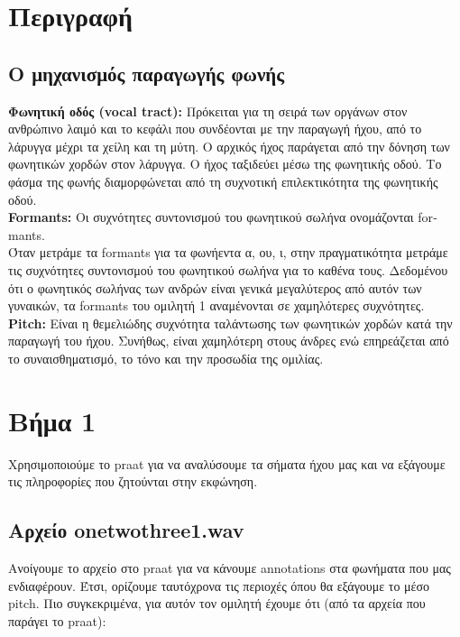 \section*{Περιγραφή}

\subsection*{Ο μηχανισμός παραγωγής φωνής}

\textbf{Φωνητική οδός (\foreignlanguage{english}{vocal tract}):} Πρόκειται για τη σειρά των οργάνων στον ανθρώπινο λαιμό και το κεφάλι που συνδέονται με την παραγωγή ήχου, από το λάρυγγα μέχρι τα χείλη και τη μύτη. Ο αρχικός ήχος παράγεται από την δόνηση των φωνητικών χορδών στον λάρυγγα. 
Ο ήχος ταξιδεύει μέσω της φωνητικής οδού. Το φάσμα της φωνής διαμορφώνεται από τη συχνοτική επιλεκτικότητα της φωνητικής οδού. \\

\noindent \textbf{\foreignlanguage{english}{Formants}:} Οι συχνότητες συντονισμού του φωνητικού σωλήνα ονομάζονται \foreignlanguage{english}{formants}. \\
\noindent Όταν μετράμε τα \foreignlanguage{english}{formants} για τα φωνήεντα α, ου, ι, στην πραγματικότητα μετράμε τις συχνότητες συντονισμού του φωνητικού σωλήνα για το καθένα τους. Δεδομένου ότι ο φωνητικός σωλήνας των ανδρών είναι γενικά μεγαλύτερος από αυτόν των γυναικών, τα formants του ομιλητή 1 αναμένονται σε χαμηλότερες συχνότητες. \\

\noindent \textbf{\foreignlanguage{english}{Pitch}:} Είναι η θεμελιώδης συχνότητα ταλάντωσης των φωνητικών χορδών κατά την παραγωγή του ήχου. Συνήθως, είναι χαμηλότερη στους άνδρες ενώ επηρεάζεται από το συναισθηματισμό, το τόνο και την προσωδία της ομιλίας. \cite{RabinerSchafer1978} \\


\section*{Βήμα 1}

Χρησιμοποιούμε το praat για να αναλύσουμε τα σήματα ήχου μας και να εξάγουμε τις πληροφορίες που ζητούνται στην εκφώνηση.

\subsection*{Αρχείο onetwothree1.wav}

Ανοίγουμε το αρχείο στο praat για να κάνουμε annotations στα φωνήματα που μας ενδιαφέρουν. Έτσι, ορίζουμε ταυτόχρονα τις περιοχές όπου θα εξάγουμε το μέσο pitch. Πιο συγκεκριμένα, για αυτόν τον ομιλητή έχουμε ότι (από τα αρχεία που παράγει το praat): 

